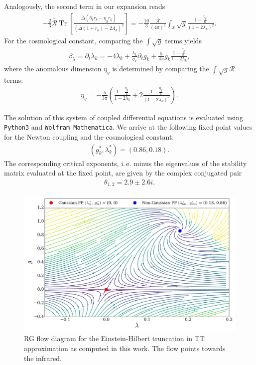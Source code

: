Analogously, the second term in our expansion reads
\begin{align}
	-\frac{2}{3}\bar{\mathcal{R}}\operatorname{Tr}\left[\frac{\bar{\Delta}\left(\partial_t r_k - \eta_g r_k\right)}{\left(\bar{\Delta}(1+r_k)-2\Lambda_k\right)^2}\right] = -\frac{10}{3}\frac{\bar{\mathcal{R}}}{(4\pi)^2}\int_x  \sqrt{g} \frac{1-\frac{\eta_g}{6}}{(1-2\lambda_k)^2}.
\end{align}
For the cosmological constant, comparing the $\int\sqrt{g}$ terms yields
\begin{align}
	\beta_{\lambda} = \partial_t\lambda_k = -4\lambda_k + \frac{\lambda_k}{g_k} \partial_t g_k + \frac{5}{4\pi}g_k\frac{1-\frac{\eta_g}{6}}{1-2\lambda_k},
\end{align}
where the anomalous dimension $\eta_g$ is determined by comparing the $\int\sqrt{g}\mathcal{R}$ terms:
\begin{align}
\eta_g = -\frac{5}{3\pi} \left(\frac{1-\frac{\eta_g}{4}}{1-2\lambda_k} + 2\frac{1-\frac{\eta_g}{6}}{(1-2\lambda_k)^2}\right).	
\end{align}

The solution of this system of coupled differential equations is evaluated using \verb|Python3| and \verb|Wolfram Mathematica|. We arrive at the following fixed point values for the Newton coupling and the cosmological constant:
\begin{align}
	(g_k^*, \lambda_k^*) = (0.86, 0.18).
\end{align}
The corresponding critical exponents, i.\,e. minus the eigenvalues of the stability matrix evaluated at the fixed point, are given by the complex conjugated pair
\begin{align}
	\theta_{1,2} = 2.9 \pm 2.6i. 
\end{align}

\begin{figure}[t]
\centering
	\includegraphics[width=\textwidth]{figs/Plots/EH_NoMatter}
	\caption[RG flow diagram for the Einstein-Hilbert truncation in TT approximation]{RG flow diagram  for the Einstein-Hilbert truncation in TT approximation as computed in this work. The flow points towards the infrared.}\end{figure}

